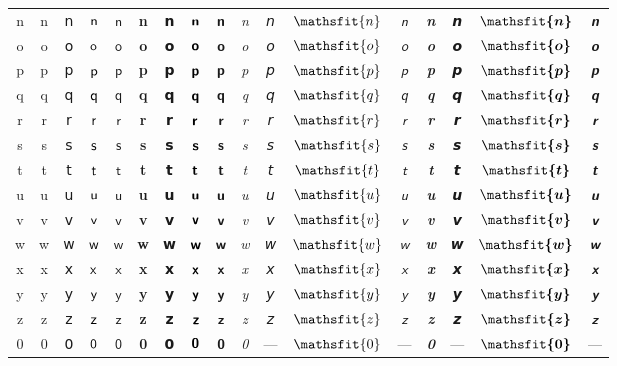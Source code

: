 \documentclass{standalone}
\newcommand{\SANS}[1]{\ifmmode\mathsf{#1}\else\textsf{#1}\fi}
\newcommand{\BSANS}[1]{\ifmmode\boldsymbol{\mathsf{#1}}\else\textbf{\textsf{#1}}\fi}
\newcommand{\ISANS}[1]{\ifmmode\mathsfit{#1}\else\textit{\textsf{#1}}\fi}
\newcommand{\BISANS}[1]{\ifmmode\bm{\mathsfit{#1}}\else\textbf{\textsf{\textit{#1}}}\fi}
\begin{document}
\begin{tabular}{c|cc|cc|cc|cc|cc|cc|cc|cc}
n & \SANS{n} & 𝗇 & $\SANS{n}$ & $𝗇$ & \BSANS{n} & 𝗻 & $\BSANS{n}$ & $𝗻$ & \ISANS{n} & 𝘯 & $\ISANS{n}$ & $𝘯$ & \BISANS{n} & 𝙣 & $\BISANS{n}$ & $𝙣$ \\
o & \SANS{o} & 𝗈 & $\SANS{o}$ & $𝗈$ & \BSANS{o} & 𝗼 & $\BSANS{o}$ & $𝗼$ & \ISANS{o} & 𝘰 & $\ISANS{o}$ & $𝘰$ & \BISANS{o} & 𝙤 & $\BISANS{o}$ & $𝙤$ \\
p & \SANS{p} & 𝗉 & $\SANS{p}$ & $𝗉$ & \BSANS{p} & 𝗽 & $\BSANS{p}$ & $𝗽$ & \ISANS{p} & 𝘱 & $\ISANS{p}$ & $𝘱$ & \BISANS{p} & 𝙥 & $\BISANS{p}$ & $𝙥$ \\
q & \SANS{q} & 𝗊 & $\SANS{q}$ & $𝗊$ & \BSANS{q} & 𝗾 & $\BSANS{q}$ & $𝗾$ & \ISANS{q} & 𝘲 & $\ISANS{q}$ & $𝘲$ & \BISANS{q} & 𝙦 & $\BISANS{q}$ & $𝙦$ \\
r & \SANS{r} & 𝗋 & $\SANS{r}$ & $𝗋$ & \BSANS{r} & 𝗿 & $\BSANS{r}$ & $𝗿$ & \ISANS{r} & 𝘳 & $\ISANS{r}$ & $𝘳$ & \BISANS{r} & 𝙧 & $\BISANS{r}$ & $𝙧$ \\
s & \SANS{s} & 𝗌 & $\SANS{s}$ & $𝗌$ & \BSANS{s} & 𝘀 & $\BSANS{s}$ & $𝘀$ & \ISANS{s} & 𝘴 & $\ISANS{s}$ & $𝘴$ & \BISANS{s} & 𝙨 & $\BISANS{s}$ & $𝙨$ \\
t & \SANS{t} & 𝗍 & $\SANS{t}$ & $𝗍$ & \BSANS{t} & 𝘁 & $\BSANS{t}$ & $𝘁$ & \ISANS{t} & 𝘵 & $\ISANS{t}$ & $𝘵$ & \BISANS{t} & 𝙩 & $\BISANS{t}$ & $𝙩$ \\
u & \SANS{u} & 𝗎 & $\SANS{u}$ & $𝗎$ & \BSANS{u} & 𝘂 & $\BSANS{u}$ & $𝘂$ & \ISANS{u} & 𝘶 & $\ISANS{u}$ & $𝘶$ & \BISANS{u} & 𝙪 & $\BISANS{u}$ & $𝙪$ \\
v & \SANS{v} & 𝗏 & $\SANS{v}$ & $𝗏$ & \BSANS{v} & 𝘃 & $\BSANS{v}$ & $𝘃$ & \ISANS{v} & 𝘷 & $\ISANS{v}$ & $𝘷$ & \BISANS{v} & 𝙫 & $\BISANS{v}$ & $𝙫$ \\
w & \SANS{w} & 𝗐 & $\SANS{w}$ & $𝗐$ & \BSANS{w} & 𝘄 & $\BSANS{w}$ & $𝘄$ & \ISANS{w} & 𝘸 & $\ISANS{w}$ & $𝘸$ & \BISANS{w} & 𝙬 & $\BISANS{w}$ & $𝙬$ \\
x & \SANS{x} & 𝗑 & $\SANS{x}$ & $𝗑$ & \BSANS{x} & 𝘅 & $\BSANS{x}$ & $𝘅$ & \ISANS{x} & 𝘹 & $\ISANS{x}$ & $𝘹$ & \BISANS{x} & 𝙭 & $\BISANS{x}$ & $𝙭$ \\
y & \SANS{y} & 𝗒 & $\SANS{y}$ & $𝗒$ & \BSANS{y} & 𝘆 & $\BSANS{y}$ & $𝘆$ & \ISANS{y} & 𝘺 & $\ISANS{y}$ & $𝘺$ & \BISANS{y} & 𝙮 & $\BISANS{y}$ & $𝙮$ \\
z & \SANS{z} & 𝗓 & $\SANS{z}$ & $𝗓$ & \BSANS{z} & 𝘇 & $\BSANS{z}$ & $𝘇$ & \ISANS{z} & 𝘻 & $\ISANS{z}$ & $𝘻$ & \BISANS{z} & 𝙯 & $\BISANS{z}$ & $𝙯$ \\
\midrule
0 & \SANS{0} & 𝟢 & $\SANS{0}$ & $𝟢$ & \BSANS{0} & 𝟬 & $\BSANS{0}$ & $𝟬$ & \ISANS{0} & — & $\ISANS{0}$ & $—$ & \BISANS{0} & — & $\BISANS{0}$ & $—$ \\

\end{tabular}
\end{document}
